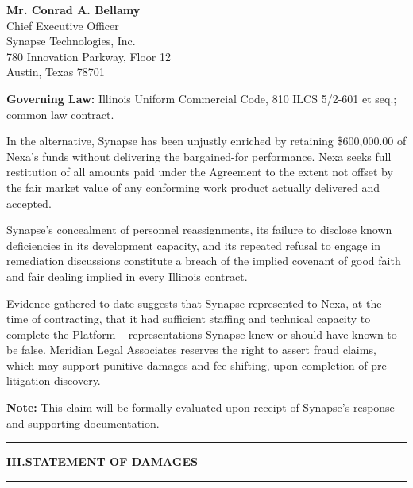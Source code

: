 \documentclass[
  paper=letter,
  fontsize=10.5pt,
  parskip=half,
  firsthead=true,
  fromalign=right,
  fromrule=false,
  addrfield=topaligned,
  subject=titled,
  foldmarks=false
]{scrlttr2}
\newcommand{\sectionrule}{%
  \par\vspace{2pt}%
  {\color{GoldAccent}\rule{\linewidth}{0.8pt}}%
  \par\vspace{4pt}%
}
\newcommand{\claimlabel}[1]{%
  {\sffamily\bfseries\color{NavyDeep}\small #1}%
}
\begin{document}
\begin{letter}{%
  \textbf{Mr. Conrad A. Bellamy}\\
  Chief Executive Officer\\
  Synapse Technologies, Inc.\\
  780 Innovation Parkway, Floor 12\\
  Austin, Texas 78701%
}
\begin{tcolorbox}[demandstyle={Claim 1 \ \ Breach of Contract}]
\medskip
\noindent\claimlabel{Governing Law:} Illinois Uniform Commercial Code, 810 ILCS 5/2-601 et seq.; common law contract.
\end{tcolorbox}

\vspace{6pt}

\begin{tcolorbox}[demandstyle={Claim 2 \ \ Unjust Enrichment \& Restitution}]
\noindent In the alternative, Synapse has been unjustly enriched by retaining \$600,000.00 of Nexa's funds without delivering the bargained-for performance. Nexa seeks full restitution of all amounts paid under the Agreement to the extent not offset by the fair market value of any conforming work product actually delivered and accepted.
\end{tcolorbox}

\vspace{6pt}

\begin{tcolorbox}[demandstyle={Claim 3 \ \ Breach of Implied Covenant of Good Faith \& Fair Dealing}]
\noindent Synapse's concealment of personnel reassignments, its failure to disclose known deficiencies in its development capacity, and its repeated refusal to engage in remediation discussions constitute a breach of the implied covenant of good faith and fair dealing implied in every Illinois contract.
\end{tcolorbox}

\vspace{6pt}

\begin{tcolorbox}[alertstyle={Claim 4 \ \ Fraudulent Misrepresentation (Potential)}]
\noindent Evidence gathered to date suggests that Synapse represented to Nexa, at the time of contracting, that it had sufficient staffing and technical capacity to complete the Platform -- representations Synapse knew or should have known to be false. Meridian Legal Associates reserves the right to assert fraud claims, which may support punitive damages and fee-shifting, upon completion of pre-litigation discovery.

\medskip
\noindent\claimlabel{Note:} This claim will be formally evaluated upon receipt of Synapse's response and supporting documentation.
\end{tcolorbox}

\newpage

\vspace*{0.3cm}

\vspace{4pt}
\sectionrule
{\sffamily\bfseries\color{NavyDeep}\normalsize III.\enspace STATEMENT OF DAMAGES}
\sectionrule


\end{letter}
\end{document}
